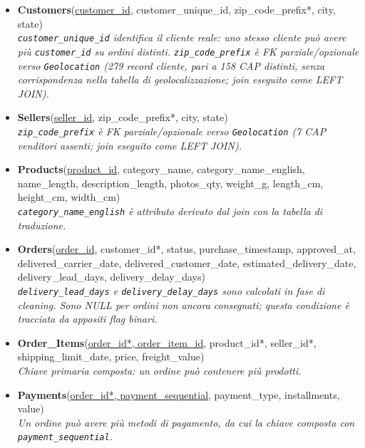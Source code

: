 \documentclass[12pt,a4paper]{article}
\begin{document}
\begin{itemize}
  \item \textbf{Customers}(\underline{customer\_id}, customer\_unique\_id,
        zip\_code\_prefix*, city, state)\\
        \textit{\texttt{customer\_unique\_id} identifica il cliente reale: uno stesso
        cliente può avere più \texttt{customer\_id} su ordini distinti.
        \texttt{zip\_code\_prefix} è FK parziale/opzionale verso \texttt{Geolocation}
        (279 record cliente, pari a 158 CAP distinti, senza corrispondenza nella tabella di geolocalizzazione; join eseguito come LEFT JOIN).}

  \item \textbf{Sellers}(\underline{seller\_id}, zip\_code\_prefix*, city, state)\\
        \textit{\texttt{zip\_code\_prefix} è FK parziale/opzionale verso \texttt{Geolocation}
        (7 CAP venditori assenti; join eseguito come LEFT JOIN).}

  \item \textbf{Products}(\underline{product\_id}, category\_name,
        category\_name\_english, name\_length, description\_length, photos\_qty,
        weight\_g, length\_cm, height\_cm, width\_cm)\\
        \textit{\texttt{category\_name\_english} è attributo derivato dal join con la
        tabella di traduzione.}

  \item \textbf{Orders}(\underline{order\_id}, customer\_id*, status,
        purchase\_timestamp, approved\_at, delivered\_carrier\_date,
        delivered\_customer\_date, estimated\_delivery\_date,
        delivery\_lead\_days, delivery\_delay\_days)\\
        \textit{\texttt{delivery\_lead\_days} e \texttt{delivery\_delay\_days} sono
        calcolati in fase di cleaning. Sono NULL per ordini non ancora consegnati;
        questa condizione è tracciata da appositi flag binari.}

  \item \textbf{Order\_Items}(\underline{order\_id*, order\_item\_id}, product\_id*,
        seller\_id*, shipping\_limit\_date, price, freight\_value)\\
        \textit{Chiave primaria composta: un ordine può contenere più prodotti.}

  \item \textbf{Payments}(\underline{order\_id*, payment\_sequential},
        payment\_type, installments, value)\\
        \textit{Un ordine può avere più metodi di pagamento, da cui la chiave composta
        con \texttt{payment\_sequential}.}


\end{itemize}
\end{document}
